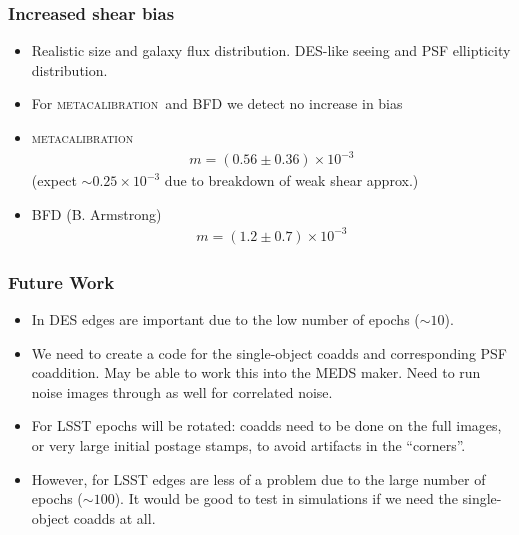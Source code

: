 \documentclass{beamer}
\newcommand{\mcal}{\textsc{metacalibration}}
\begin{document}
\frame
{
    \frametitle{Increased shear bias}

 
    \begin{itemize}

        \item Realistic size and galaxy flux distribution.  DES-like seeing and
            PSF ellipticity distribution.


        \item For \mcal\ and BFD we detect no increase in bias
        \item \mcal 
            \begin{align}
            m = (0.56 \pm 0.36) \times 10^{-3}
            \end{align}
            (expect $\sim 0.25 \times 10^{-3}$ due to breakdown of weak shear approx.)

        \item BFD (B. Armstrong)
            \begin{align}
                m = (1.2 \pm 0.7) \times 10^{-3}
            \end{align}



    \end{itemize}

}

\frame
{
    \frametitle{Future Work}

 
 
    \begin{itemize}

        \item In DES edges are important due to the low number of epochs
            ($\sim10$).

        \item We need to create a code for the single-object coadds and
            corresponding PSF coaddition.  May be able to work this into the
            MEDS maker.  Need to run noise images through as well for
            correlated noise.

        \item For LSST epochs will be rotated: coadds need to be done on the
            full images, or very large initial postage stamps,  to avoid
            artifacts in the ``corners''.

        \item However, for LSST edges are less of a problem due to the large
            number of epochs ($\sim 100$).  It would be good to test in
            simulations if we need the single-object coadds at all.

    \end{itemize}

}
\end{document}
